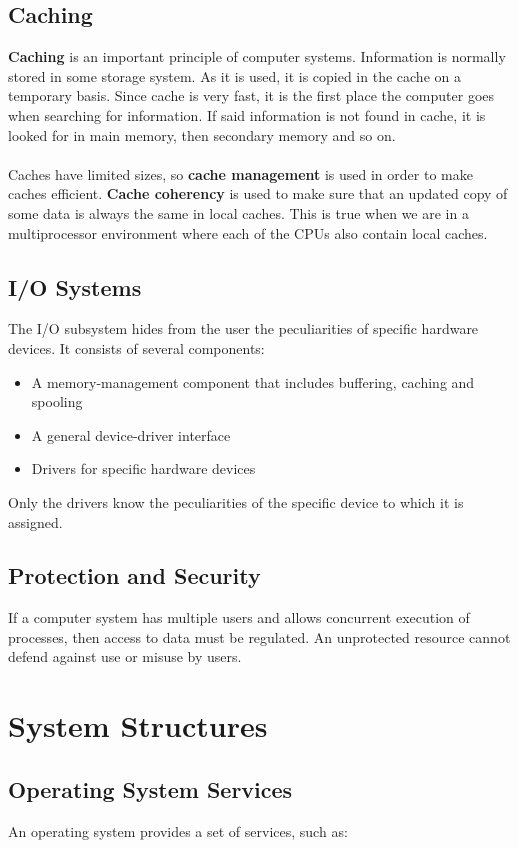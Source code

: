 \documentclass{article}
\begin{document}
\subsection{Caching}
\textbf{Caching} is an important principle of computer systems. Information is normally stored in some storage system. As it is used, it is copied in the cache on a temporary basis. Since cache is very fast, it is the first place the computer goes when searching for information. If said information is not found in cache, it is looked for in main memory, then secondary memory and so on. \\ \\
Caches have limited sizes, so \textbf{cache management} is used in order to make caches efficient. \textbf{Cache coherency} is used to make sure that an updated copy of some data is always the same in local caches. This is true when we are in a multiprocessor environment where each of the CPUs also contain local caches.

\subsection{I/O Systems}
The I/O subsystem hides from the user the peculiarities of specific hardware devices. It consists of several components:

\begin{itemize}
	\item A memory-management component that includes buffering, caching and spooling
	\item A general device-driver interface
	\item Drivers for specific hardware devices
\end{itemize}
Only the drivers know the peculiarities of the specific device to which it is assigned.

\subsection{Protection and Security}
If a computer system has multiple users and allows concurrent execution of processes, then access to data must be regulated. An unprotected resource cannot defend against use or misuse by users.

\section{System Structures}
\subsection{Operating System Services}
An operating system provides a set of services, such as:
\end{document}
